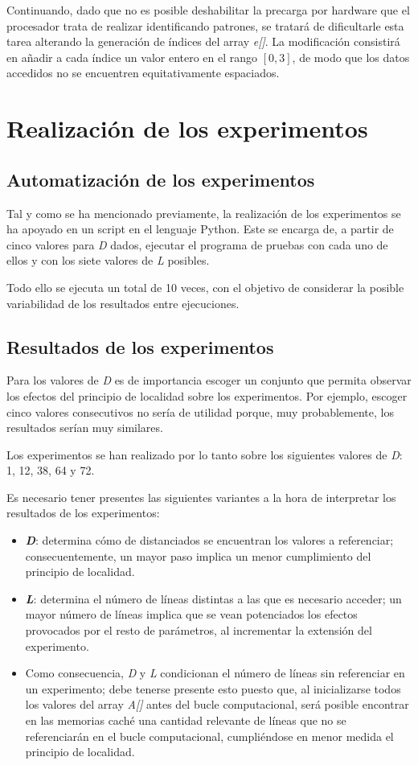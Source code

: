 \documentclass[conference]{IEEEtran}
\begin{document}
Continuando, dado que no es posible deshabilitar la precarga por hardware que el procesador trata de realizar identificando patrones, se tratará de dificultarle esta tarea alterando la generación de índices del array \textit{e[]}. La modificación consistirá en añadir a cada índice un valor entero en el rango $[0, 3]$, de modo que los datos accedidos no se encuentren equitativamente espaciados.

\section{Realización de los experimentos} \label{experimentos}

\subsection{Automatización de los experimentos}
Tal y como se ha mencionado previamente, la realización de los experimentos se ha apoyado en un script en el lenguaje Python. Este se encarga de, a partir de cinco valores para \textit{D} dados, ejecutar el programa de pruebas con cada uno de ellos y con los siete valores de \textit{L} posibles.

Todo ello se ejecuta un total de 10 veces, con el objetivo de considerar la posible variabilidad de los resultados entre ejecuciones.

\subsection{Resultados de los experimentos}
Para los valores de \textit{D} es de importancia escoger un conjunto que permita observar los efectos del principio de localidad sobre los experimentos. Por ejemplo, escoger cinco valores consecutivos no sería de utilidad porque, muy probablemente, los resultados serían muy similares.

Los experimentos se han realizado por lo tanto sobre los siguientes valores de \textit{D}: 1, 12, 38, 64 y 72.

Es necesario tener presentes las siguientes variantes a la hora de interpretar los resultados de los experimentos:
\begin{itemize}
    \item \textbf{\textit{D}}: determina cómo de distanciados se encuentran los valores a referenciar; consecuentemente, un mayor paso implica un menor cumplimiento del principio de localidad.
    \item \textbf{\textit{L}}: determina el número de líneas distintas a las que es necesario acceder; un mayor número de líneas implica que se vean potenciados los efectos provocados por el resto de parámetros, al incrementar la extensión del experimento.
    \item Como consecuencia, \textit{D} y \textit{L} condicionan el número de líneas sin referenciar en un experimento; debe tenerse presente esto puesto que, al inicializarse todos los valores del array \textit{A[]} antes del bucle computacional, será posible encontrar en las memorias caché una cantidad relevante de líneas que no se referenciarán en el bucle computacional, cumpliéndose en menor medida el principio de localidad.
\end{itemize}
\end{document}
